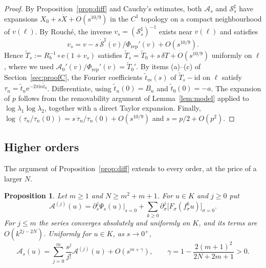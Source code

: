 \documentclass[11pt]{amsart}
\newtheorem{proposition}[theorem]{Proposition}
\theoremstyle{definition}
\newcommand{\Rr}{R}
\newcommand{\eee}{\mathrm{e}}
\newcommand{\ii}{\mathrm{i}}
\begin{document}
\begin{proof}
By Proposition~\ref{prop:diff} and Cauchy's estimates, both $\mathcal A_s$ and
$\mathcal S^\sharp_s$ have expansions $X_0+s\dot X+O(s^{10/9})$ in the
$C^1$ topology on a compact neighbourhood of $v(\ell)$.  By Rouch\'e, the inverse
$v_s=(\mathcal S^\sharp_s)^{-1}$ exists near $v(\ell)$ and satisfies
\[
 v_s=v-s\,\dot{\mathcal S}^\sharp(v)/\Phi_{\mathrm{rep}}'(v)+O(s^{10/9}).
\]
Hence $\tilde T_s:=\Rr_b^{-1}\circ\eee(1+v_s)$ satisfies
$\tilde T_s=\tilde T_0+s\,\delta T+O(s^{10/9})$ uniformly on $\ell$, where we used
$\mathcal A_0'(v)/\Phi_{\mathrm{rep}}'(v)=\tilde T_0'$.  By items (a)--(c) of
Section~\ref{sec:proofC}, the Fourier coefficients $\tilde t_m(s)$ of
$\tilde T_s-\mathrm{id}$ on $\ell$ satisfy
$\tau_n=\tilde t_n\eee^{-2\pi\ii n\tilde t_0}$.  Differentiate, using
$\tilde t_n(0)=B_n$ and $\tilde t_0(0)=-a$.  The expansion of $p$ follows from
the removability argument of Lemma~\ref{lem:model} applied to
$\log\lambda_1\log\lambda_2$, together with a direct Taylor expansion.  Finally,
$\log(\tau_n/\tau_n(0))=s\,\dot\tau_n/\tau_n(0)+O(s^{10/9})$ and $s=p/2+O(p^2)$.
\end{proof}

\subsection{Higher orders}\label{sec:higher}
The argument of Proposition~\ref{prop:diff} extends to every order, at the
price of a larger $N$.

\begin{proposition}\label{prop:higher}
Let $m\ge1$ and $N\ge m^2+m+1$.  For $u\in K$ and $j\ge0$ put
\begin{equation}\label{eq:Aj}
 \mathcal A^{(j)}(u)=\partial_s^j\Psi_s(u)\big|_{s=0}
 +\sum_{k\ge0}\partial_\sigma^j\bigl[F_\sigma(f_\sigma^ku)\bigr]_{\sigma=0}.
\end{equation}
For $j\le m$ the series converges absolutely and uniformly on $K$, and its
terms are $O(k^{2j-2N})$.  Uniformly for $u\in K$, as $s\to0^+$,
\[
 \mathcal A_s(u)=\sum_{j=0}^m\frac{s^j}{j!}\mathcal A^{(j)}(u)+O(s^{m+\gamma}),\qquad
 \gamma=1-\frac{2(m+1)^2}{2N+2m+1}>0 .
\]
\end{proposition}
\end{document}
